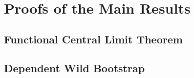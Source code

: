 \section{Proofs of the Main Results}

\subsection{Functional Central Limit Theorem}

\subsection{Dependent Wild Bootstrap}

